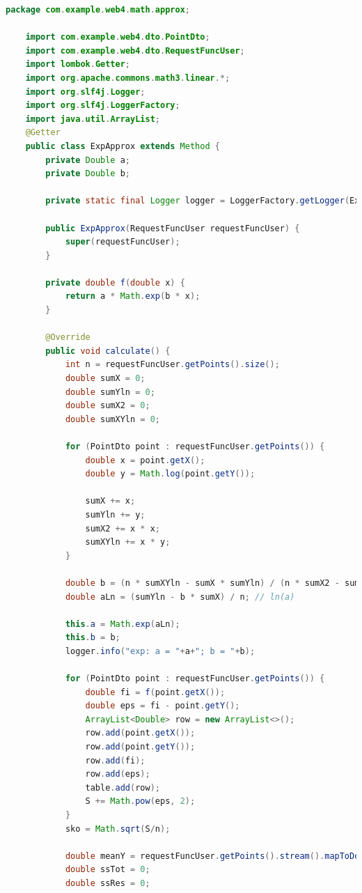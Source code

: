 \documentclass{article}
\begin{document}
\begin{lstlisting}[language=Java, caption={Експоненциальная аппроксимация}]
    package com.example.web4.math.approx;

    import com.example.web4.dto.PointDto;
    import com.example.web4.dto.RequestFuncUser;
    import lombok.Getter;
    import org.apache.commons.math3.linear.*;
    import org.slf4j.Logger;
    import org.slf4j.LoggerFactory;
    import java.util.ArrayList;
    @Getter
    public class ExpApprox extends Method {
        private Double a;
        private Double b;
    
        private static final Logger logger = LoggerFactory.getLogger(ExpApprox.class);
    
        public ExpApprox(RequestFuncUser requestFuncUser) {
            super(requestFuncUser);
        }
    
        private double f(double x) {
            return a * Math.exp(b * x);
        }
    
        @Override
        public void calculate() {
            int n = requestFuncUser.getPoints().size();
            double sumX = 0;
            double sumYln = 0;
            double sumX2 = 0;
            double sumXYln = 0;
    
            for (PointDto point : requestFuncUser.getPoints()) {
                double x = point.getX();
                double y = Math.log(point.getY()); 
    
                sumX += x;
                sumYln += y;
                sumX2 += x * x;
                sumXYln += x * y;
            }
    
            double b = (n * sumXYln - sumX * sumYln) / (n * sumX2 - sumX * sumX);
            double aLn = (sumYln - b * sumX) / n; // ln(a)
    
            this.a = Math.exp(aLn);
            this.b = b;
            logger.info("exp: a = "+a+"; b = "+b);
    
            for (PointDto point : requestFuncUser.getPoints()) {
                double fi = f(point.getX());
                double eps = fi - point.getY();
                ArrayList<Double> row = new ArrayList<>();
                row.add(point.getX());
                row.add(point.getY());
                row.add(fi);
                row.add(eps);
                table.add(row);
                S += Math.pow(eps, 2);
            }
            sko = Math.sqrt(S/n);
    
            double meanY = requestFuncUser.getPoints().stream().mapToDouble(PointDto::getY).average().orElse(0);
            double ssTot = 0;
            double ssRes = 0;
    

\end{lstlisting}
\end{document}
